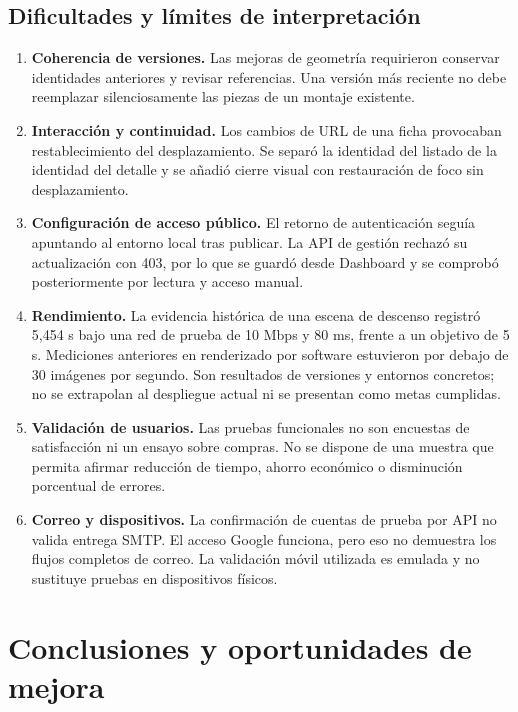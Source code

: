 \documentclass[12pt,letterpaper]{article}
\newcommand{\pagina}{\clearpage}
\begin{document}
\subsection{Dificultades y límites de interpretación}
\begin{enumerate}
\item \textbf{Coherencia de versiones.} Las mejoras de geometría requirieron conservar identidades anteriores y revisar referencias. Una versión más reciente no debe reemplazar silenciosamente las piezas de un montaje existente.
\item \textbf{Interacción y continuidad.} Los cambios de URL de una ficha provocaban restablecimiento del desplazamiento. Se separó la identidad del listado de la identidad del detalle y se añadió cierre visual con restauración de foco sin desplazamiento.
\item \textbf{Configuración de acceso público.} El retorno de autenticación seguía apuntando al entorno local tras publicar. La API de gestión rechazó su actualización con 403, por lo que se guardó desde Dashboard y se comprobó posteriormente por lectura y acceso manual.
\item \textbf{Rendimiento.} La evidencia histórica de una escena de descenso registró 5,454 s bajo una red de prueba de 10 Mbps y 80 ms, frente a un objetivo de 5 s. Mediciones anteriores en renderizado por software estuvieron por debajo de 30 imágenes por segundo. Son resultados de versiones y entornos concretos; no se extrapolan al despliegue actual ni se presentan como metas cumplidas.
\item \textbf{Validación de usuarios.} Las pruebas funcionales no son encuestas de satisfacción ni un ensayo sobre compras. No se dispone de una muestra que permita afirmar reducción de tiempo, ahorro económico o disminución porcentual de errores.
\item \textbf{Correo y dispositivos.} La confirmación de cuentas de prueba por API no valida entrega SMTP. El acceso Google funciona, pero eso no demuestra los flujos completos de correo. La validación móvil utilizada es emulada y no sustituye pruebas en dispositivos físicos.
\end{enumerate}


\pagina

\section{Conclusiones y oportunidades de mejora}
\end{document}

